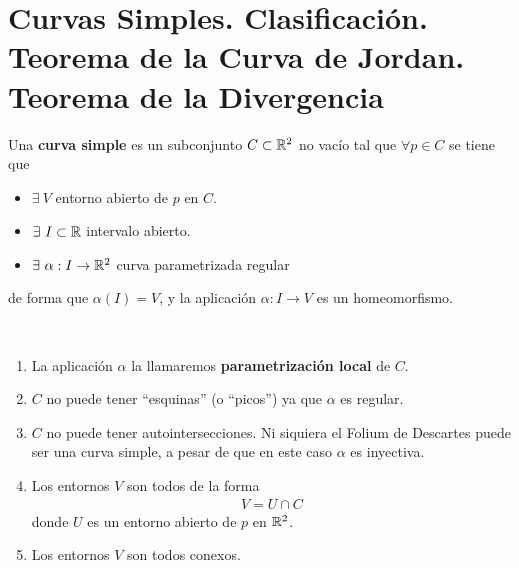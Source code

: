 \chapter{Curvas Simples. Clasificación. Teorema de la Curva de Jordan. Teorema de la Divergencia}

\begin{definicion}
    Una \textbf{curva simple} es un subconjunto $C\subset \mathbb{R}^2$ no vacío tal que $\forall p\in C$ se tiene que 
    \begin{itemize}
        \item $\exists\ V$ entorno abierto de $p$ en $C$.
        \item $\exists\ I\subset \mathbb{R}$ intervalo abierto.
        \item $\exists\ \alpha:I \to \mathbb{R}^2$ curva parametrizada regular
    \end{itemize} 
    de forma que $\alpha(I)=V$, y la aplicación $\alpha:I\to V$ es un homeomorfismo.
\end{definicion}



\begin{observacion}\
    \begin{enumerate}
        \item La aplicación $\alpha$ la llamaremos \textbf{parametrización local} de $C$.
        \item $C$ no puede tener ``esquinas'' (o ``picos'') ya que $\alpha$ es regular.
        \item $C$ no puede tener autointersecciones. Ni siquiera el Folium de Descartes puede ser una curva simple, a pesar de que en este caso $\alpha$ es inyectiva.
        \item Los entornos $V$ son todos de la forma
        \begin{gather*}
            V = U\cap C
        \end{gather*}
        donde $U$ es un entorno abierto de $p$ en $\mathbb{R}^2$.
        \item Los entornos $V$ son todos conexos.
    \end{enumerate}
\end{observacion}

